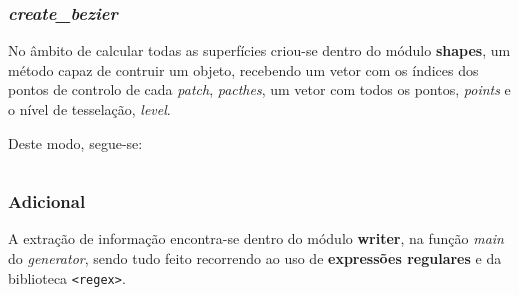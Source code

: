 \documentclass[relatorio.tex]{subfiles}
\begin{document}
\subsubsection{\textit{create\_bezier}}
No âmbito de calcular todas as superfícies criou-se dentro do módulo \textbf{shapes}, 
um método capaz de contruir um objeto, recebendo um vetor com os índices dos pontos de controlo
de cada \textit{patch}, \textit{pacthes},
um vetor com todos os pontos, \textit{points} e o nível de tesselação, \textit{level}.

Deste modo, segue-se:
\begin{code}
    \label{code:shapes.h}
    \inputminted[firstline=44, lastline=44]{cpp}{../../generator/shapes.h}
\end{code}

\subsubsection{Adicional}

A extração de informação encontra-se dentro do módulo \textbf{writer}, na função \textit{main} do \textit{generator},
sendo tudo feito recorrendo ao uso de \textbf{expressões regulares} e da biblioteca \texttt{<regex>}.
\end{document}
